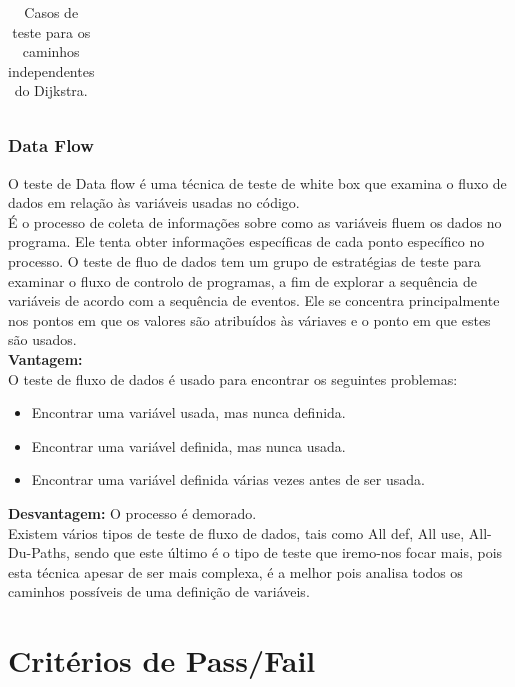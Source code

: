 \documentclass{article}
\begin{document}
\begin{itemize}
\begin{enumerate}
\begin{table}[H]
\begin{tabular}{|c|p{7cm}|p{3cm}|}
    \end{tabular}
    \caption{Casos de teste para os caminhos independentes do Dijkstra.}
    \label{tab:tabela_exemplo}
\end{table}

\end{enumerate}

\end{itemize}
\subsubsection{Data Flow}

O teste de Data flow é uma técnica de teste de white box que examina o fluxo de dados em relação às variáveis usadas no código.\\
É o processo de coleta de informações sobre como as variáveis fluem os dados no programa. Ele tenta obter informações específicas de cada ponto específico no processo. O teste de fluo de dados tem um grupo de estratégias de teste para examinar o fluxo de controlo de programas, a fim de explorar a sequência de variáveis de acordo com a sequência de eventos. Ele se concentra principalmente nos pontos em que os valores são atribuídos às váriaves e o ponto em que estes são usados.\\
\textbf{Vantagem:}\\
O teste de fluxo de dados é usado para encontrar os seguintes problemas:\\
\begin{itemize}
    \item Encontrar uma variável usada, mas nunca definida.
    \item Encontrar uma variável definida, mas nunca usada.
    \item Encontrar uma variável definida várias vezes antes de ser usada.
\end{itemize}

\textbf{Desvantagem:}
O processo é demorado.\\
Existem vários tipos de teste de fluxo de dados, tais como All def, All use, All-Du-Paths, sendo que este último é o tipo de teste que iremo-nos focar mais, pois esta técnica apesar de ser mais complexa, é a melhor pois analisa todos os caminhos possíveis de uma definição de variáveis.

\section{Critérios de Pass/Fail}
\end{document}
